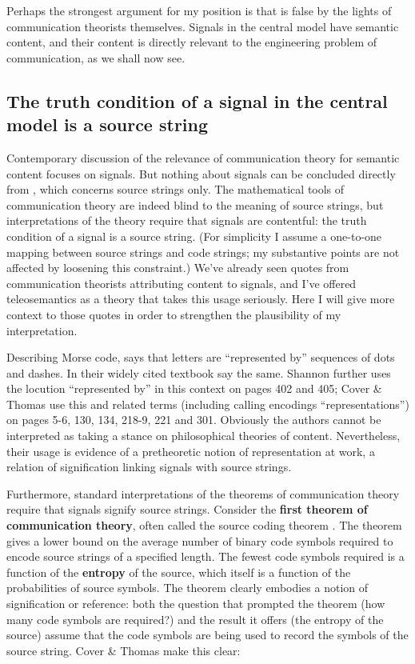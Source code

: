 \documentclass[12pt]{article}
\begin{document}
Perhaps the strongest argument for my position is that \tic{} is false by the lights of communication theorists themselves.
Signals in the central model have semantic content, and their content is directly relevant to the engineering problem of communication, as we shall now see.


\subsection{The truth condition of a signal in the central model is a source string}\label{subsec:signalContent}

Contemporary discussion of the relevance of communication theory for semantic content focuses on signals.
But nothing about signals can be concluded directly from \sw{}, which concerns source strings only.
The mathematical tools of communication theory are indeed blind to the meaning of source strings, but interpretations of the theory require that signals are contentful: the truth condition of a signal is a source string.
(For simplicity I assume a one-to-one mapping between source strings and code strings; my substantive points are not affected by loosening this constraint.)
We've already seen quotes from communication theorists attributing content to signals, and I've offered teleosemantics as a theory that takes this usage seriously.
Here I will give more context to those quotes in order to strengthen the plausibility of my interpretation.

Describing Morse code, \citet[385]{shannon1948mathematicalc} says that letters are ``represented by'' sequences of dots and dashes.
In their widely cited textbook \citet[105]{cover2006elements} say the same.
Shannon further uses the locution ``represented by'' in this context on pages 402 and 405; Cover \& Thomas use this and related terms (including calling encodings ``representations'') on pages 5-6, 130, 134, 218-9, 221 and 301.
Obviously the authors cannot be interpreted as taking a stance on philosophical theories of content.
Nevertheless, their usage is evidence of a pretheoretic notion of representation at work, a relation of signification linking signals with source strings.

Furthermore, standard interpretations of the theorems of communication theory require that signals signify source strings.
Consider the \textbf{first theorem of communication theory}, often called the source coding theorem \citep[$\S$5]{cover2006elements} \citep[$\S$4]{mackay2003information}.
The theorem gives a lower bound on the average number of binary code symbols required to encode source strings of a specified length.
The fewest code symbols required is a function of the \textbf{entropy} of the source, which itself is a function of the probabilities of source symbols.
The theorem clearly embodies a notion of signification or reference: both the question that prompted the theorem (how many code symbols are required?) and the result it offers (the entropy of the source) assume that the code symbols are being used to record the symbols of the source string.
Cover \& Thomas make this clear:
\end{document}
